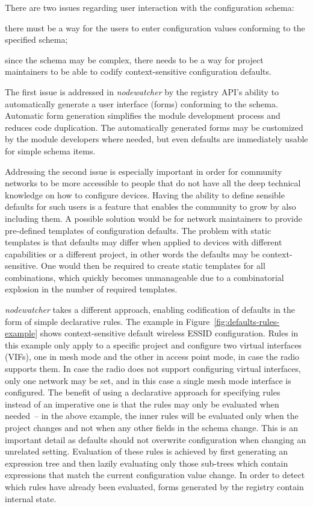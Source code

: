 \documentclass[5p,sort&compress]{elsarticle}
\newcommand{\nodewatcher}{\textit{nodewatcher}}
\begin{document}
There are two issues regarding user interaction with the configuration schema:
\begin{enumerate*}[label=\itshape\alph*\upshape)]
\item there must be a way for the users to enter configuration values conforming to the specified schema;
\item since the schema may be complex, there needs to be a way for project maintainers to be able to codify context-sensitive configuration defaults.
\end{enumerate*}
The first issue is addressed in \nodewatcher{} by the registry API's ability to automatically generate a user interface (forms) conforming to the schema.
Automatic form generation simplifies the module development process and reduces code duplication.
The automatically generated forms may be customized by the module developers where needed, but even defaults are immediately usable for simple schema items.

Addressing the second issue is especially important in order for community networks to be more accessible to people that do not have all the deep technical knowledge on how to configure devices.
Having the ability to define sensible defaults for such users is a feature that enables the community to grow by also including them.
A possible solution would be for network maintainers to provide pre-defined templates of configuration defaults.
The problem with static templates is that defaults may differ when applied to devices with different capabilities or a different project, in other words the defaults may be context-sensitive.
One would then be required to create static templates for all combinations, which quickly becomes unmanageable due to a combinatorial explosion in the number of required templates.

\nodewatcher{} takes a different approach, enabling codification of defaults in the form of simple declarative rules.
The example in Figure~\ref{fig:defaults-rules-example} shows context-sensitive default wireless ESSID configuration.
Rules in this example only apply to a specific project and configure two virtual interfaces (VIFs), one in mesh mode and the other in access point mode, in case the radio supports them.
In case the radio does not support configuring virtual interfaces, only one network may be set, and in this case a single mesh mode interface is configured.
The benefit of using a declarative approach for specifying rules instead of an imperative one is that the rules may only be evaluated when needed~-- in the above example, the inner rules will be evaluated only when the project changes and not when any other fields in the schema change.
This is an important detail as defaults should not overwrite configuration when changing an unrelated setting.
Evaluation of these rules is achieved by first generating an expression tree and then lazily evaluating only those sub-trees which contain expressions that match the current configuration value change.
In order to detect which rules have already been evaluated, forms generated by the registry contain internal state.
\end{document}
